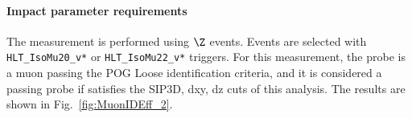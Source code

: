 
\paragraph*{Impact parameter requirements}
The measurement is performed using $\Z$ events. Events are selected with \verb=HLT_IsoMu20_v*= or \verb=HLT_IsoMu22_v*= triggers.
For this measurement, the probe is a muon passing the POG Loose identification criteria,
and it is considered a passing probe if satisfies the SIP3D, dxy, dz cuts of this analysis.
%
The results are shown in Fig.~\ref{fig:MuonIDEff_2}.



